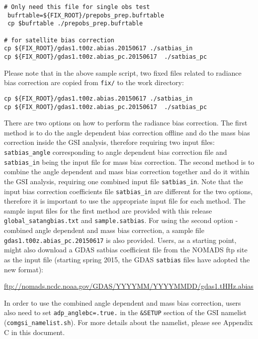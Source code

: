 \begin{footnotesize}
\begin{verbatim}
# Only need this file for single obs test
 bufrtable=${FIX_ROOT}/prepobs_prep.bufrtable
 cp $bufrtable ./prepobs_prep.bufrtable

# for satellite bias correction
cp ${FIX_ROOT}/gdas1.t00z.abias.20150617 ./satbias_in
cp ${FIX_ROOT}/gdas1.t00z.abias_pc.20150617  ./satbias_pc
\end{verbatim}
\end{footnotesize}

Please note that in the above sample script, two fixed files related to radiance bias correction are copied from \verb|fix/| to the work directory: 

\begin{small}
\begin{verbatim}
cp ${FIX_ROOT}/gdas1.t00z.abias.20150617 ./satbias_in
cp ${FIX_ROOT}/gdas1.t00z.abias_pc.20150617  ./satbias_pc
\end{verbatim}
\end{small}

There are two options on how to perform the radiance bias correction. The first method is to do the angle dependent bias correction offline and do the mass bias correction inside the GSI analysis, therefore requiring two input files: \verb|satbias_angle| corresponding to angle dependent bias correction file and \verb|satbias_in| being the input file for mass bias correction. The second method is to combine the angle dependent and mass bias correction together and do it within the GSI analysis, requiring one combined input file \verb|satbias_in|. Note that the input bias correction coefficients file \verb|satbias_in| are different for the two options, therefore it is important to use the appropriate input file for each method. The sample input files for the first method are provided with this release  \verb|global_satangbias.txt| and \verb|sample.satbias|. For using the second option - combined angle dependent and mass bias correction, a sample file \verb|gdas1.t00z.abias_pc.20150617| is also provided. Users, as a starting point, might also download a GDAS satbias coefficient file from the NOMADS ftp site as the input file (starting spring 2015, the GDAS \verb|satbias| files have adopted the new format):

\url{ftp://nomads.ncdc.noaa.gov/GDAS/YYYYMM/YYYYMMDD/gdas1.tHHz.abias} 

In order to use the combined angle dependent and mass bias correction, users also need to set \verb|adp_anglebc=.true.| in the \verb|&SETUP| section of the GSI namelist (\verb|comgsi_namelist.sh|).  For more details about the namelist, please see Appendix C in this document. 

